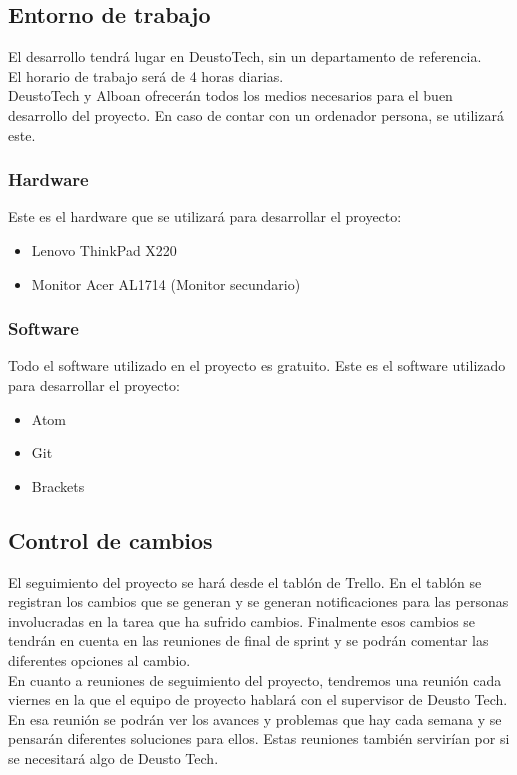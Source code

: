 \subsection{Entorno de trabajo}
El desarrollo tendrá lugar en DeustoTech, sin un departamento de referencia.\\

El horario de trabajo será de 4 horas diarias.\\

DeustoTech y Alboan ofrecerán todos los medios necesarios para el buen desarrollo del proyecto. En caso de contar con un ordenador persona, se utilizará este.

\subsubsection{Hardware}
Este es el hardware que se utilizará para desarrollar el proyecto:
\begin{itemize}
	\item Lenovo ThinkPad X220
	\item Monitor Acer AL1714 (Monitor secundario)
\end{itemize}

\subsubsection{Software}
Todo el software utilizado en el proyecto es gratuito. Este es el software utilizado para desarrollar el proyecto:
\begin{itemize}
	\item Atom
	\item Git
	\item Brackets
\end{itemize}

\subsection{Control de cambios}
El seguimiento del proyecto se hará desde el tablón de Trello. En el tablón se registran los cambios que se generan y se generan notificaciones para las personas involucradas en la tarea que ha sufrido cambios. Finalmente esos cambios se tendrán en cuenta en las reuniones de final de sprint y se podrán comentar las diferentes opciones al cambio.\\

En cuanto a reuniones de seguimiento del proyecto, tendremos una reunión cada viernes en la que el equipo de proyecto hablará con el supervisor de Deusto Tech. En esa reunión se podrán ver los avances y problemas que hay cada semana y se pensarán diferentes soluciones para ellos. Estas reuniones también servirían por si se necesitará algo de Deusto Tech.

